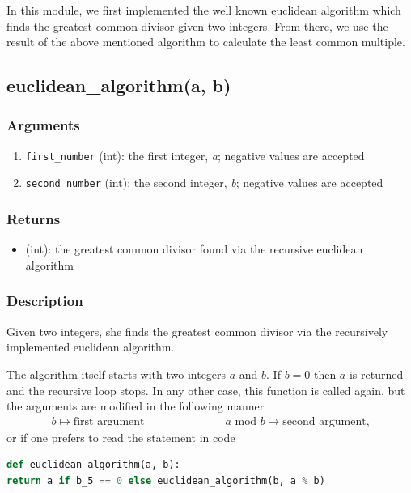 \documentclass[refman]{scrartcl}
\newcommand{\mymod}{\text{\ \ mod\ \ }}
\begin{document}
In this module, we first implemented the well known euclidean algorithm which finds the greatest common divisor given two integers. From there, we use the result of the above mentioned algorithm to calculate the least common multiple.

\subsection{euclidean\_algorithm(a, b)}

\subsubsection*{Arguments}

\begin{enumerate}
  \item \texttt{first\_number} (int): the first integer, \textit{a}; negative values are accepted
  \item \texttt{second\_number} (int): the second integer, \textit{b}; negative values are accepted
\end{enumerate}

\subsubsection*{Returns}

\begin{itemize}
  \item (int): the greatest common divisor found via the recursive euclidean algorithm
\end{itemize}

\subsubsection*{Description}

Given two integers, she finds the greatest common divisor via the recursively implemented euclidean algorithm.

The algorithm itself starts with two integers \(a\) and \(b\). If \(b = 0\) then \(a\) is returned and the recursive loop stops. In any other case, this function is called again, but the arguments are modified in the following manner
%
\begin{align*}
	b \mapsto \text{first argument} \hspace{3cm} a \mymod b \mapsto \text{second argument} \text{,}
\end{align*}
%
or if one prefers to read the statement in code
%
\begin{lstlisting}[language=Python]
def euclidean_algorithm(a, b):
return a if b_5 == 0 else euclidean_algorithm(b, a % b)
\end{lstlisting}
\end{document}
